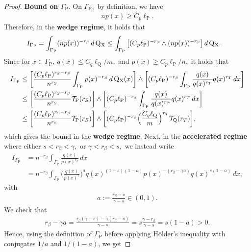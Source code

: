 \documentclass[10pt,a4paper]{amsart}
\renewcommand{\P}{\operatorname{P}}
\newcommand{\Q}{\operatorname{Q}}
\newcommand{\mT}{\mathcal{T}}
\newcommand{\sX}{\mathrm{X}}
\begin{document}
\begin{proof}
    \noindent\textbf{Bound on $\Gamma_{\P}.$} On $\Gamma_{\P},$ by definition, we have
    \begin{align*}
        np(x) \geq C_p\ell_{\P}.
    \end{align*}
    Therefore, in the \textbf{wedge regime}, it holds that
    \begin{align*}
        I_{\Gamma_{\P}} &= \int_{\Gamma_{\P}}(np(x))^{-r_\beta}\, d\Q\mathstrut_{\!\sX} \leq \int_{\Gamma_{\P}}\big[(C_p\ell_{\P})^{-r_\beta} \wedge (np(x))^{-r_\beta}\big]\, d\Q\mathstrut_{\!\sX}.
    \end{align*}
    Since for $x \in \Gamma_{\P}, \ q(x) \leq C_q\ell_{\Q}/m,$ and $p(x) \geq C_p\ell_{\P}/n,$ it holds that 
    \begin{align*}
        I_{\Gamma_{\P}} &\leq \bigg[\frac{(C_p\ell_{\P})^{r_S - r_\beta}}{n^{r_S}}\int_{\Gamma_{\P}}p(x)^{-r_S}\, d\Q\mathstrut_{\!\sX}(x)\bigg] \wedge \bigg[(C_p\ell_{\P})^{-r_\beta}\int_{\Gamma_{\P}}\frac{q(x)}{q(x)^{r_T}}q(x)^{r_T}\, dx\bigg]\\
        &\leq \bigg[\frac{(C_p\ell_{\P})^{r_S - r_\beta}}{n^{r_S}}\mT_{\P}(r_S)\bigg] \wedge \bigg[(C_p\ell_{\P})^{-r_\beta}\int_{\Gamma_{\P}}\frac{q(x)}{q(x)^{r_T}}q(x)^{r_T}\, dx\bigg]\\
        &\leq \bigg[\frac{(C_p\ell_{\P})^{r_S - r_\beta}}{n^{r_S}}\mT_{\P}(r_S)\bigg] \wedge \bigg[(C_p\ell_{\P})^{-r_\beta}\Big(\frac{C_q\ell_{\Q}}{m}\Big)^{r_T}\mT_{\Q}(r_T)\bigg],
    \end{align*}
    which gives the bound in the \textbf{wedge regime}. Next, in the \textbf{accelerated regime} where either $s < r_\beta < \gamma,$ or $\gamma < r_\beta < s,$ we instead write
    \begin{align*}
        I_{\Gamma_{\P}} &= n^{-r_\beta}\int_{\Gamma_{\P}}\frac{q(x)}{p(x)^{r_\beta}}\, dx \\
        &= n^{-r_\beta}\int_{\Gamma_{\P}}\Big(\frac{q(x)}{p(x)^{\gamma}}\Big)^aq(x)^{(1 - s)(1 - a)}p(x)^{-(r_\beta - \gamma a)}q(x)^{s(1 - a)}\, dx,
    \end{align*}
    with 
    \begin{align}
        \label{eq.a}
        a := \tfrac{r_\beta - s}{\gamma - s} \in (0, 1).    
    \end{align}
    We check that
    \begin{align*}
        r_\beta - \gamma a = \frac{r_\beta(\gamma - s) - \gamma(r_\beta -s)}{\gamma - s} = s\frac{\gamma - r_\beta}{\gamma - s}  = s(1 - a) > 0.
    \end{align*}
    Hence, using the definition of $\Gamma_{\P}$ before applying H\"older's inequality with conjugates $1/a$ and $1/(1 - a)$, we get

\end{proof}
\end{document}
